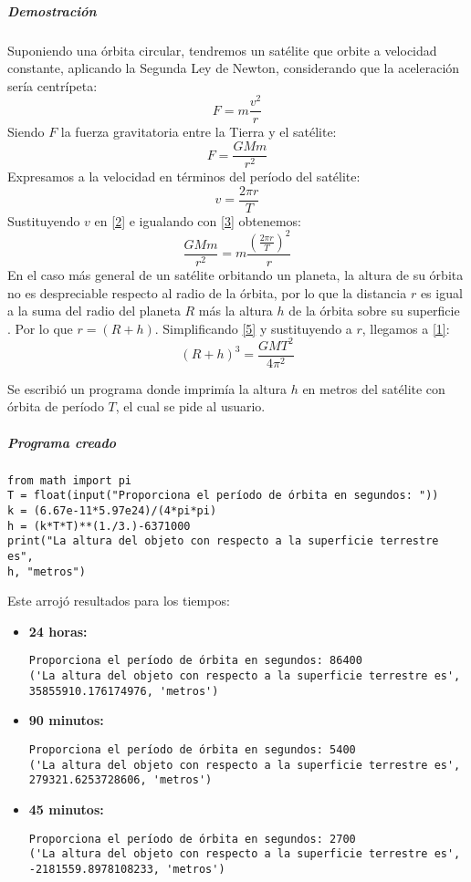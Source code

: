 \documentclass[12pt]{article}
\begin{document}
\subparagraph*{Demostración}
Suponiendo una órbita circular, tendremos un satélite que orbite a velocidad constante, aplicando la Segunda Ley de Newton, considerando que la aceleración sería centrípeta:
\begin{equation} \label{2}
F=m\frac{v^2}{r}
\end{equation}
Siendo $F$ la fuerza gravitatoria entre la Tierra y el satélite:
\begin{equation} \label{3}
F=\frac{GMm}{r^2}
\end{equation}
Expresamos a la velocidad en términos del período del satélite:
\begin{equation} \label{4}
v=\frac{2\pi r}{T}
\end{equation}
Sustituyendo $v$ en \eqref{2} e igualando con \eqref{3} obtenemos:
\begin{equation} \label{5}
\frac{GMm}{r^2}=m\frac{{(\frac{2\pi r}{T})}^2}{r}
\end{equation}
En el caso más general de un satélite orbitando un planeta, la altura de su órbita no es despreciable respecto al radio de la órbita, por lo que la distancia $r$ es igual a la suma del radio del planeta $R$ más la altura $h$ de la órbita sobre su superficie \cite{3}. Por lo que $r=(R+h)$. Simplificando \eqref{5} y sustituyendo a $r$, llegamos a \eqref{1}:
\begin{equation}
(R+h)^3=\frac{GMT^2}{4\pi^2}
\end{equation}

Se escribió un programa donde imprimía la altura $h$ en metros del satélite con órbita de período $T$, el cual se pide al usuario. 

\subparagraph*{Programa creado}
\begin{verbatim}
from math import pi
T = float(input("Proporciona el período de órbita en segundos: "))
k = (6.67e-11*5.97e24)/(4*pi*pi)
h = (k*T*T)**(1./3.)-6371000
print("La altura del objeto con respecto a la superficie terrestre es",
h, "metros")
\end{verbatim}

Este arrojó resultados para los tiempos:
\begin{itemize}
\item \textbf{24 horas:}
\begin{verbatim}
Proporciona el período de órbita en segundos: 86400
('La altura del objeto con respecto a la superficie terrestre es',
35855910.176174976, 'metros')
\end{verbatim}
\item \textbf{90 minutos:}
\begin{verbatim}
Proporciona el período de órbita en segundos: 5400
('La altura del objeto con respecto a la superficie terrestre es',
279321.6253728606, 'metros')
\end{verbatim}
\item \textbf{45 minutos:}
\begin{verbatim}
Proporciona el período de órbita en segundos: 2700
('La altura del objeto con respecto a la superficie terrestre es',
-2181559.8978108233, 'metros')
\end{verbatim}
\end{itemize}
\end{document}
